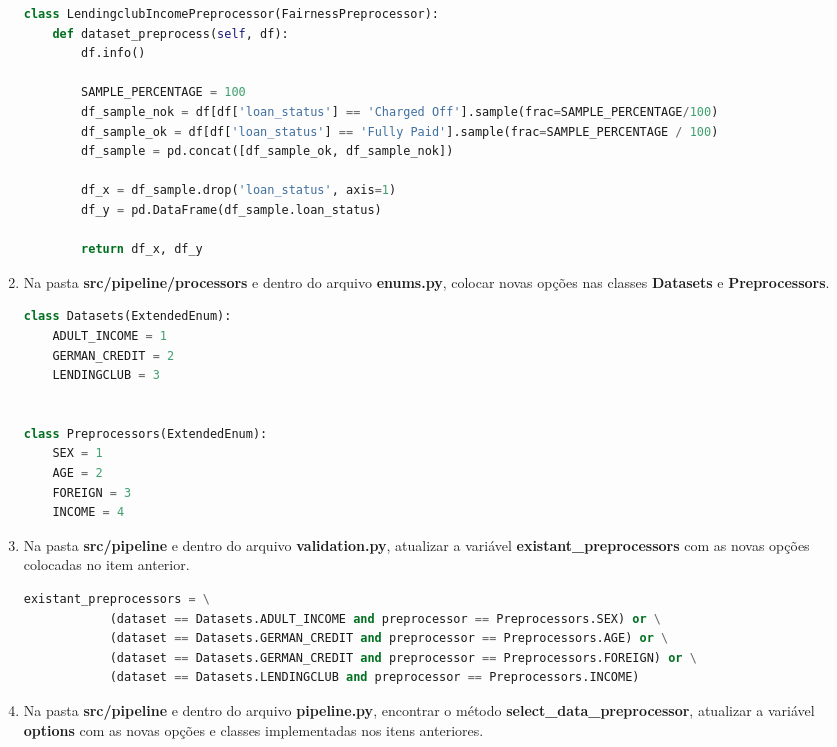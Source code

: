\documentclass[portugues]{ic-tese}
\begin{document}
\begin{enumerate}
\begin{lstlisting}[language=Python, label=cod:FairnessPreprocessor]
class LendingclubIncomePreprocessor(FairnessPreprocessor):
    def dataset_preprocess(self, df):
        df.info()

        SAMPLE_PERCENTAGE = 100
        df_sample_nok = df[df['loan_status'] == 'Charged Off'].sample(frac=SAMPLE_PERCENTAGE/100)
        df_sample_ok = df[df['loan_status'] == 'Fully Paid'].sample(frac=SAMPLE_PERCENTAGE / 100)
        df_sample = pd.concat([df_sample_ok, df_sample_nok])

        df_x = df_sample.drop('loan_status', axis=1)
        df_y = pd.DataFrame(df_sample.loan_status)

        return df_x, df_y
\end{lstlisting}

\item Na pasta \textbf{src/pipeline/processors} e dentro do arquivo \textbf{enums.py}, colocar novas opções nas classes \textbf{Datasets} e \textbf{Preprocessors}.

\begin{lstlisting}[language=Python, label=cod:EnumOptions]
class Datasets(ExtendedEnum):
    ADULT_INCOME = 1
    GERMAN_CREDIT = 2
    LENDINGCLUB = 3


class Preprocessors(ExtendedEnum):
    SEX = 1
    AGE = 2
    FOREIGN = 3
    INCOME = 4
\end{lstlisting}

\item Na pasta \textbf{src/pipeline} e dentro do arquivo \textbf{validation.py}, atualizar a variável \textbf{existant\_preprocessors} com as novas opções colocadas no item anterior.

\begin{lstlisting}[language=Python, label=cod:ValidationPreprocessors]
        existant_preprocessors = \
            (dataset == Datasets.ADULT_INCOME and preprocessor == Preprocessors.SEX) or \
            (dataset == Datasets.GERMAN_CREDIT and preprocessor == Preprocessors.AGE) or \
            (dataset == Datasets.GERMAN_CREDIT and preprocessor == Preprocessors.FOREIGN) or \
            (dataset == Datasets.LENDINGCLUB and preprocessor == Preprocessors.INCOME)
\end{lstlisting}

\item Na pasta \textbf{src/pipeline} e dentro do arquivo \textbf{pipeline.py}, encontrar o método \textbf{select\_data\_preprocessor}, atualizar a variável \textbf{options} com as novas opções e classes implementadas nos itens anteriores.


\end{enumerate}
\end{document}
